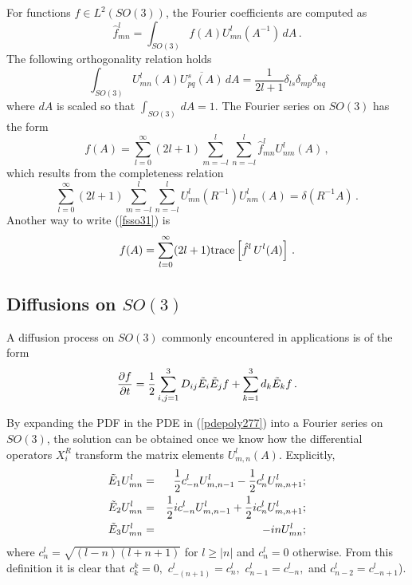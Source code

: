 \documentclass{svmult}
\def\half{ {1\over 2} }
\begin{document}
For functions $f \in L^2(SO(3))$, the Fourier coefficients are computed as
\begin{equation}
\hat{f}_{mn}^{l} = \int_{SO(3)}
f(A) U_{mn}^{l}(A^{-1})\,dA\,.
\label{fsso32}
\end{equation}
The following orthogonality relation holds
\begin{equation}
\int_{SO(3)} U_{mn}^{l}(A) \overline{U_{pq}^{s}(A)}\,dA = \frac{1}{2l+1} \delta_{ls} \delta_{mp} \delta_{nq}
\label{intorthoso3}
\end{equation}
where $dA$ is scaled so that $\int_{SO(3)}\,dA = 1$.
The Fourier series on $SO(3)$ has the form
\begin{equation}
f(A) = \sum_{l=0}^{\infty} (2l+1) \sum_{m=-l}^{l} \sum_{n=-l}^{l}
\hat{f}_{mn}^{l} U_{nm}^{l}(A)\,,
\label{fsso31}
\end{equation}
which results from the completeness relation
\begin{equation}
\sum_{l=0}^{\infty} (2l+1) \sum_{m=-l}^{l} \sum_{n=-l}^{l}
U_{mn}^{l}(R^{-1}) U_{nm}^{l}(A) = \delta(R^{-1} A)\,.
\label{so3complete9292}
\end{equation}
Another way to write (\ref{fsso31}) is
\begin{equation}
f(A) = \sum_{l=0}^{\infty} (2l+1) {\rm trace}\left[
\hat{f}^{l}\, U^{l}(A)\right]\,.
\label{fsso31aa}
\end{equation}

\subsection{Diffusions on $SO(3)$}

A diffusion process on $SO(3)$ commonly encountered in applications is of the form
\begin{equation}
\frac{\partial f}{\partial t} =
\half \sum_{i,j=1}^{3} D_{ij} \tilde{E}_{i} \tilde{E}_{j} f + \sum_{k=1}^{3}
d_k \tilde{E}_{k} f\,.
\label{pdepoly277}
\end{equation}

By expanding the PDF in the PDE in (\ref{pdepoly277})
into a Fourier series on $SO(3)$, the solution can be obtained
once we know how the differential operators $X_{i}^{R}$ transform the matrix elements $U_{m,n}^{l}(A)$. Explicitly,
\begin{eqnarray}
\tilde{E}_{1} U_{mn}^{l} &=& \half c_{-n}^{l} U_{m,n-1}^{l} -
\half c_{n}^{l} U_{m,n+1}^{l}; \label{oper1} \\
\tilde{E}_{2} U_{mn}^{l} &=&
\half i c_{-n}^{l} U_{m,n-1}^{l} +
\half i c_{n}^{l} U_{m,n+1}^{l}; \\
\tilde{E}_{3} U_{mn}^{l} &=& -in U_{mn}^{l};
\label{oper3}
\end{eqnarray}
where $c_{n}^{l} = \sqrt{(l-n)(l+n+1)}$ for $l \geq |n|$ and
$c_{n}^{l} = 0$ otherwise. From this definition it is clear that
$c_{k}^{k} = 0,$ $c_{-(n+1)}^{l} = c_{n}^{l},$ $c_{n-1}^{l} = c_{-n}^{l},$ and $c_{n-2}^{l} = c_{-n+1}^{l}$).
\end{document}
